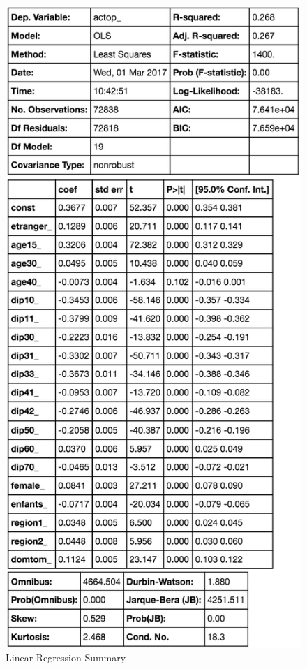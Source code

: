 \begin{figure}
    \centering
    \includegraphics[scale=0.33]{img/linear_regression_summary}
    \caption{Linear Regression Summary}
    \label{fig:linear_regression_summary}
\end{figure}

